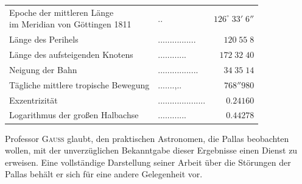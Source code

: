 \begin{center}\fontsize{10}{12}\selectfont\setlength{\tabcolsep}{4pt}\renewcommand{\arraystretch}{1.15}\begin{tabular}{llr}
\shortstack[l]{Epoche der mittleren Länge\\im Meridian von Göttingen 1811} & .\;. & $126^\circ\;33'\;6''$\\
Länge des Perihels & .\;.\;.\;.\;.\;.\;.\;.\;.\;.\;.\;.\;.\;.\;.\;. & $120\;55\;8$\\
Länge des aufsteigenden Knotens & .\;.\;.\;.\;.\;.\;.\;.\;.\;.\;.\;. & $172\;32\;40$\\
Neigung der Bahn & .\;.\;.\;.\;.\;.\;.\;.\;.\;.\;.\;.\;.\;.\;.\;.\;. & $34\;35\;14$\\
Tägliche mittlere tropische Bewegung & .\;.\;.\;.\;.\;.\;.\;,\;.\;. & $768''980$\\
Exzentrizität & .\;.\;.\;.\;.\;.\;.\;.\;.\;.\;.\;.\;.\;.\;.\;.\;.\;.\;.\;. & $0.24160$\\
Logarithmus der großen Halbachse & .\;.\;.\;.\;.\;.\;.\;.\;.\;.\;.\;. & $0.44278$\\
\end{tabular}\end{center}

\par\indent Professor \textsc{Gauss} glaubt, den praktischen Astronomen, die Pallas beobachten wollen, mit der unverzüglichen Bekanntgabe dieser Ergebnisse einen Dienst zu erweisen. Eine vollständige Darstellung seiner Arbeit über die Störungen der Pallas behält er sich für eine andere Gelegenheit vor.
